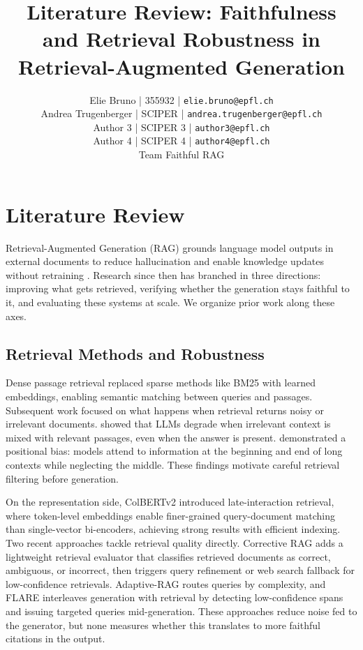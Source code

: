 \documentclass[11pt]{article}
\title{Literature Review: Faithfulness and Retrieval Robustness in Retrieval-Augmented Generation}
\author{\normalfont
Elie Bruno | 355932 | \texttt{elie.bruno@epfl.ch} \\
Andrea Trugenberger | SCIPER | \texttt{andrea.trugenberger@epfl.ch} \\
Author 3 | SCIPER 3 | \texttt{author3@epfl.ch} \\
Author 4 | SCIPER 4 | \texttt{author4@epfl.ch} \\
Team Faithful RAG \\
}
\begin{document}
\maketitle
\thispagestyle{fancy}

\section{Literature Review}

Retrieval-Augmented Generation (RAG) grounds language model outputs in external documents to reduce hallucination and enable knowledge updates without retraining \cite{retrievalaugmentedgeneration}. Research since then has branched in three directions: improving what gets retrieved, verifying whether the generation stays faithful to it, and evaluating these systems at scale. We organize prior work along these axes.

\subsection{Retrieval Methods and Robustness}

Dense passage retrieval \cite{karpukhin-etal-2020-dense} replaced sparse methods like BM25 with learned embeddings, enabling semantic matching between queries and passages. Subsequent work focused on what happens when retrieval returns noisy or irrelevant documents. \citet{shi2023large} showed that LLMs degrade when irrelevant context is mixed with relevant passages, even when the answer is present. \citet{liu2024lost} demonstrated a positional bias: models attend to information at the beginning and end of long contexts while neglecting the middle. These findings motivate careful retrieval filtering before generation.

On the representation side, ColBERTv2 \cite{santhanam2022colbertv2} introduced late-interaction retrieval, where token-level embeddings enable finer-grained query-document matching than single-vector bi-encoders, achieving strong results with efficient indexing. Two recent approaches tackle retrieval quality directly. Corrective RAG \cite{yan2024corrective} adds a lightweight retrieval evaluator that classifies retrieved documents as correct, ambiguous, or incorrect, then triggers query refinement or web search fallback for low-confidence retrievals. Adaptive-RAG \cite{jeong2024adaptiverag} routes queries by complexity, and FLARE \cite{jiang2023active} interleaves generation with retrieval by detecting low-confidence spans and issuing targeted queries mid-generation. These approaches reduce noise fed to the generator, but none measures whether this translates to more faithful citations in the output.
\end{document}
